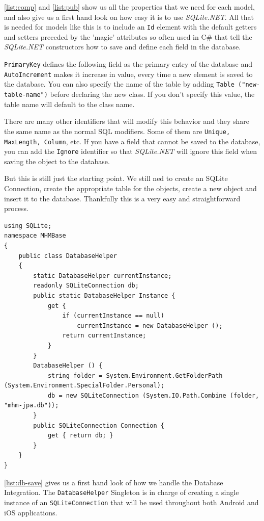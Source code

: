 \autoref{list:comp} and \autoref{list:pub} show us all the properties that we need for each model, and also give us a first hand look on how easy it is to use \textit{SQLite.NET}. All that is needed for models like this is to include an \texttt{Id} element with the default getters and setters preceded by the 'magic' attributes so often used in C\# that tell the \textit{SQLite.NET} constructors how to save and define each field in the database. 

\texttt{PrimaryKey} defines the following field as the primary entry of the database and \texttt{AutoIncrement} makes it increase in value, every time a new element is saved to the database. You can also specify the name of the table by adding \texttt{Table ("new-table-name")} before declaring the new class. If you don't specify this value, the table name will default to the class name.

There are many other identifiers that will modify this behavior and they share the same name as the normal SQL modifiers. Some of them are \texttt{Unique, MaxLength, Column}, etc. If you have a field that cannot be saved to the database, you can add the \texttt{Ignore} identifier so that \textit{SQLite.NET} will ignore this field when saving the object to the database.

But this is still just the starting point. We still ned to create an SQLite Connection, create the appropriate table for the objects, create a new object and insert it to the database. Thankfully this is a very easy and straightforward process.

\begin{lstlisting}[frame=lt,caption=DatabaseHelper.cs, label={list:db-save}]
using SQLite;
namespace MHMBase
{
	public class DatabaseHelper
	{
		static DatabaseHelper currentInstance;
		readonly SQLiteConnection db;
		public static DatabaseHelper Instance {
			get {
				if (currentInstance == null)
					currentInstance = new DatabaseHelper ();
				return currentInstance;			
			}
		}
		DatabaseHelper () {
			string folder = System.Environment.GetFolderPath (System.Environment.SpecialFolder.Personal);
			db = new SQLiteConnection (System.IO.Path.Combine (folder, "mhm-jpa.db"));		
		}
		public SQLiteConnection Connection {
			get { return db; }		
		}
	}
}
\end{lstlisting}

\autoref{list:db-save} gives us a first hand look of how we handle the Database Integration. The \texttt{DatabaseHelper} Singleton  is in charge of creating a single instance of an \texttt{SQLiteConnection} that will be used throughout both Android and iOS applications.

